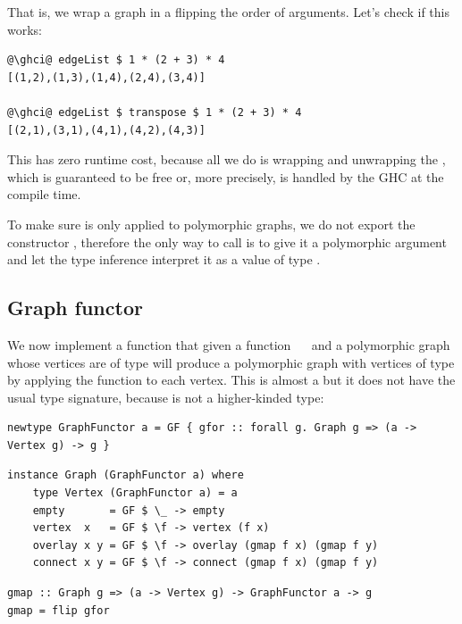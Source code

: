 \noindent
That is, we wrap a graph in a  flipping the order of  arguments.
Let's check if this works:

\begin{verbatim}
@\ghci@ edgeList $ 1 * (2 + 3) * 4
[(1,2),(1,3),(1,4),(2,4),(3,4)]

@\ghci@ edgeList $ transpose $ 1 * (2 + 3) * 4
[(2,1),(3,1),(4,1),(4,2),(4,3)]
\end{verbatim}

This has zero runtime cost, because all we do is wrapping and unwrapping
the , which is guaranteed to be free or, more precisely, is handled
by the GHC at the compile time.

To make sure  is only applied to polymorphic graphs, we do not export
the constructor , therefore the only way to call  is to give it a
polymorphic argument and let the type inference interpret it as a value of type
.

\subsection{Graph functor}\label{sub-functor}

We now implement a function  that given a function ~\hs{->}~
and a polymorphic graph whose vertices are of type  will produce a
polymorphic graph with vertices of type  by applying the function
to each vertex. This is almost a  but it does not have the usual
type signature, because  is not a higher-kinded type:

\vspace{2mm}
\begin{verbatim}
newtype GraphFunctor a = GF { gfor :: forall g. Graph g => (a -> Vertex g) -> g }
\end{verbatim}
\vspace{1mm}
\begin{verbatim}
instance Graph (GraphFunctor a) where
    type Vertex (GraphFunctor a) = a
    empty       = GF $ \_ -> empty
    vertex  x   = GF $ \f -> vertex (f x)
    overlay x y = GF $ \f -> overlay (gmap f x) (gmap f y)
    connect x y = GF $ \f -> connect (gmap f x) (gmap f y)
\end{verbatim}
\vspace{1mm}
\begin{verbatim}
gmap :: Graph g => (a -> Vertex g) -> GraphFunctor a -> g
gmap = flip gfor
\end{verbatim}

